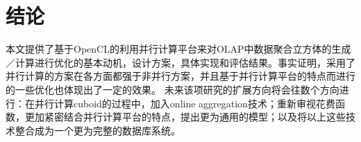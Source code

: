 \chapter{结论}
本文提供了基于OpenCL的利用并行计算平台来对OLAP中数据聚合立方体的生成／计算进行优化的基本动机，设计方案，具体实现和评估结果。事实证明，采用了并行计算的方案在各方面都强于非并行方案，并且基于并行计算平台的特点而进行的一些优化也体现出了一定的效果。
未来该项研究的扩展方向将会往数个方向进行：在并行计算cuboid的过程中，加入online aggregation技术；重新审视花费函数，更加紧密结合并行计算平台的特点，提出更为通用的模型；以及将以上这些技术整合成为一个更为完整的数据库系统。